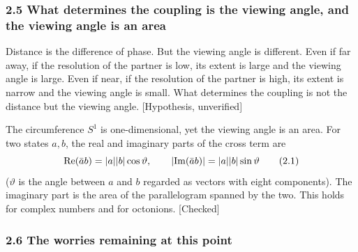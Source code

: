 \documentclass[
  a4paper,
]{article}
\begin{document}
\subsubsection{2.5 What determines the coupling is the viewing angle,
and the viewing angle is an
area}\label{what-determines-the-coupling-is-the-viewing-angle-and-the-viewing-angle-is-an-area}

Distance is the difference of phase. But the viewing angle is different.
Even if far away, if the resolution of the partner is low, its extent is
large and the viewing angle is large. Even if near, if the resolution of
the partner is high, its extent is narrow and the viewing angle is
small. What determines the coupling is not the distance but the viewing
angle. {[}Hypothesis, unverified{]}

The circumference \(S^1\) is one-dimensional, yet the viewing angle is
an area. For two states \(a, b\), the real and imaginary parts of the
cross term are \[
{\rm Re}(\bar a b) = \lvert a\rvert\lvert b\rvert\cos\vartheta,\qquad \lvert{\rm Im}(\bar a b)\rvert = \lvert a\rvert\lvert b\rvert\sin\vartheta \tag{2.1}
\] (\(\vartheta\) is the angle between \(a\) and \(b\) regarded as
vectors with eight components). The imaginary part is the area of the
parallelogram spanned by the two. This holds for complex numbers and for
octonions. {[}Checked{]}

\subsubsection{2.6 The worries remaining at this
point}\label{the-worries-remaining-at-this-point}
\end{document}
